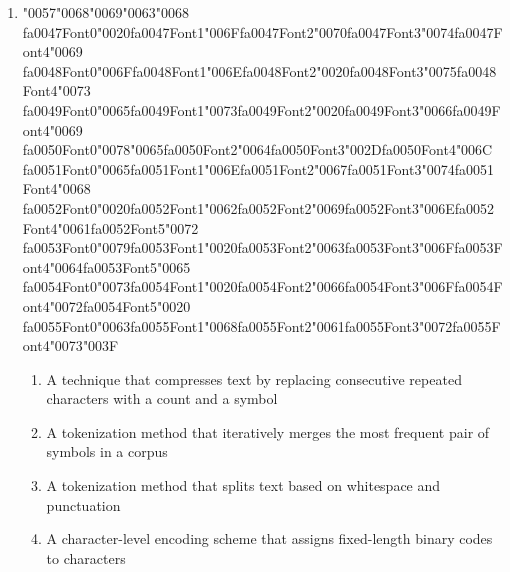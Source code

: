 \documentclass[12pt]{article}
\begin{document}
\begin{enumerate}[label=Q\arabic*.]
\item {\char"0057}{\char"0068}{\char"0069}{\char"0063}{\char"0068} {\csname fa0047Font0\endcsname\char"0020}{\csname fa0047Font1\endcsname\char"006F}{\csname fa0047Font2\endcsname\char"0070}{\csname fa0047Font3\endcsname\char"0074}{\csname fa0047Font4\endcsname\char"0069} {\csname fa0048Font0\endcsname\char"006F}{\csname fa0048Font1\endcsname\char"006E}{\csname fa0048Font2\endcsname\char"0020}{\csname fa0048Font3\endcsname\char"0075}{\csname fa0048Font4\endcsname\char"0073} {\csname fa0049Font0\endcsname\char"0065}{\csname fa0049Font1\endcsname\char"0073}{\csname fa0049Font2\endcsname\char"0020}{\csname fa0049Font3\endcsname\char"0066}{\csname fa0049Font4\endcsname\char"0069} {\csname fa0050Font0\endcsname\char"0078}{\char"0065}{\csname fa0050Font2\endcsname\char"0064}{\csname fa0050Font3\endcsname\char"002D}{\csname fa0050Font4\endcsname\char"006C} {\csname fa0051Font0\endcsname\char"0065}{\csname fa0051Font1\endcsname\char"006E}{\csname fa0051Font2\endcsname\char"0067}{\csname fa0051Font3\endcsname\char"0074}{\csname fa0051Font4\endcsname\char"0068} {\csname fa0052Font0\endcsname\char"0020}{\csname fa0052Font1\endcsname\char"0062}{\csname fa0052Font2\endcsname\char"0069}{\csname fa0052Font3\endcsname\char"006E}{\csname fa0052Font4\endcsname\char"0061}{\csname fa0052Font5\endcsname\char"0072} {\csname fa0053Font0\endcsname\char"0079}{\csname fa0053Font1\endcsname\char"0020}{\csname fa0053Font2\endcsname\char"0063}{\csname fa0053Font3\endcsname\char"006F}{\csname fa0053Font4\endcsname\char"0064}{\csname fa0053Font5\endcsname\char"0065} {\csname fa0054Font0\endcsname\char"0073}{\csname fa0054Font1\endcsname\char"0020}{\csname fa0054Font2\endcsname\char"0066}{\csname fa0054Font3\endcsname\char"006F}{\csname fa0054Font4\endcsname\char"0072}{\csname fa0054Font5\endcsname\char"0020} {\csname fa0055Font0\endcsname\char"0063}{\csname fa0055Font1\endcsname\char"0068}{\csname fa0055Font2\endcsname\char"0061}{\csname fa0055Font3\endcsname\char"0072}{\csname fa0055Font4\endcsname\char"0073}{\char"003F}
\begin{enumerate}[label=(\Alph*)]
    \item A technique that compresses text by replacing consecutive repeated characters with a count and a symbol
    \item A tokenization method that iteratively merges the most frequent pair of symbols in a corpus
    \item A tokenization method that splits text based on whitespace and punctuation
    \item A character-level encoding scheme that assigns fixed-length binary codes to characters

\end{enumerate}
\end{enumerate}
\end{document}
